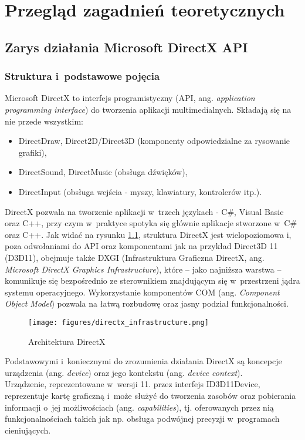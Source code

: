 
\chapter{Przegląd zagadnień teoretycznych}

\section{Zarys działania Microsoft DirectX API}

\subsection{Struktura i~podstawowe pojęcia}

Microsoft DirectX to interfejs programistyczny (API, ang. \emph{application programming interface}) do tworzenia aplikacji multimedialnych. Składają się na nie przede wszystkim:

\begin{itemize}
\item DirectDraw, Direct2D/Direct3D (komponenty odpowiedzialne za rysowanie grafiki),
\item DirectSound, DirectMusic (obsługa dźwięków),
\item DirectInput (obsługa wejścia - myszy, klawiatury, kontrolerów itp.).
\end{itemize}

DirectX pozwala na tworzenie aplikacji w~trzech językach - C\#, Visual Basic oraz C++, przy czym w~praktyce spotyka się głównie aplikacje stworzone w~C\# oraz C++.
Jak widać na rysunku \ref{directx_infrastructure}, struktura DirectX jest wielopoziomowa i, poza odwołaniami do API oraz komponentami jak na przykład Direct3D 11 (D3D11), obejmuje także DXGI (Infrastruktura Graficzna DirectX, ang. \emph{Microsoft DirectX Graphics Infrastructure}), które -- jako najniższa warstwa -- komunikuje się bezpośrednio ze sterownikiem znajdującym się w~przestrzeni jądra systemu operacyjnego. Wykorzystanie komponentów COM (ang. \emph{Component Object Model}) pozwala na łatwą rozbudowę oraz jasny podział funkcjonalności.\\
\begin{figure}
\begin{center}
\texttt{[image: figures/directx\_infrastructure.png]}
\caption{Architektura DirectX}
\label{directx_infrastructure}
\end{center}
\end{figure}

Podstawowymi i~koniecznymi do zrozumienia działania DirectX są koncepcje urządzenia (ang. \emph{device}) oraz jego kontekstu (ang. \emph{device context}).\\
Urządzenie, reprezentowane w~wersji 11. przez interfejs ID3D11Device, reprezentuje kartę graficzną i~może służyć do tworzenia zasobów oraz pobierania informacji o~jej możliwościach (ang. \emph{capabilities}), tj. oferowanych przez nią funkcjonalnościach takich jak np. obsługa podwójnej precyzji w~programach cieniujących.

